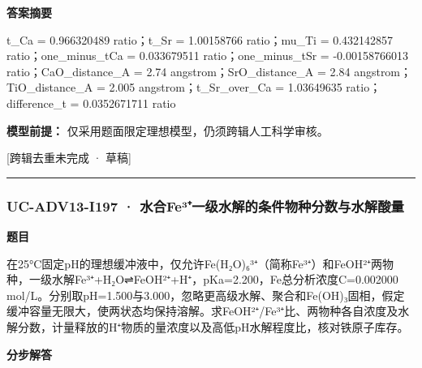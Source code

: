\documentclass[UTF8,11pt,a4paper]{ctexart}
\begin{document}
\noindent\textbf{答案摘要}\par
t\_Ca = 0.966320489 ratio；t\_Sr = 1.00158766 ratio；mu\_Ti = 0.432142857 ratio；one\_minus\_tCa = 0.033679511 ratio；one\_minus\_tSr = -0.00158766013 ratio；CaO\_distance\_A = 2.74 angstrom；SrO\_distance\_A = 2.84 angstrom；TiO\_distance\_A = 2.005 angstrom；t\_Sr\_over\_Ca = 1.03649635 ratio；difference\_t = 0.0352671711 ratio\par
\noindent\textbf{模型前提：}
仅采用题面限定理想模型，仍须跨辑人工科学审核。\par
\noindent\textcolor{red!65!black}{[跨辑去重未完成 · 草稿]} \par
\medskip\hrule\medskip
{}
\subsubsection*{UC-ADV13-I197 · 水合Fe³⁺一级水解的条件物种分数与水解酸量}
\noindent\textbf{题目}\par
在25°C固定pH的理想缓冲液中，仅允许Fe(H₂O)₆³⁺（简称Fe³⁺）和FeOH²⁺两物种，一级水解Fe³⁺+H₂O⇌FeOH²⁺+H⁺，pKa=2.200，Fe总分析浓度C=0.002000 mol/L。分别取pH=1.500与3.000，忽略更高级水解、聚合和Fe(OH)₃固相，假定缓冲容量无限大，使两状态均保持溶解。求FeOH²⁺/Fe³⁺比、两物种各自浓度及水解分数，计量释放的H⁺物质的量浓度以及高低pH水解程度比，核对铁原子库存。\par
\medskip\noindent\textbf{分步解答}
\end{document}
